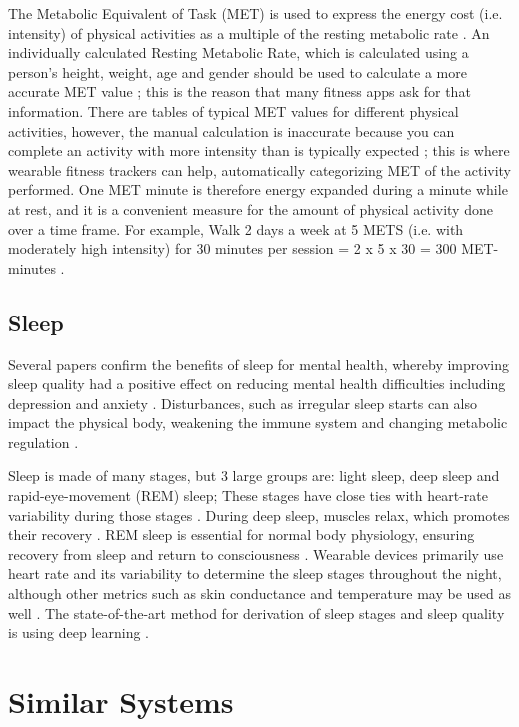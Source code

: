 The Metabolic Equivalent of Task (MET) is used to express the energy cost (i.e. intensity) of physical activities as a multiple of the resting metabolic rate \cite{Jetté1990Metabolic}. An individually calculated Resting Metabolic Rate, which is calculated using a person's height, weight, age and gender should be used to calculate a more accurate MET value \cite{Byrne2005Metabolic}; this is the reason that many fitness apps ask for that information. There are tables of typical MET values for different physical activities, however, the manual calculation is inaccurate because you can complete an activity with more intensity than is typically expected \cite{Jetté1990Metabolic}; this is where wearable fitness trackers can help, automatically categorizing MET of the activity performed. One MET minute is therefore energy expanded during a minute while at rest, and it is a convenient measure for the amount of physical activity done over a time frame. For example, Walk 2 days a week at 5 METS (i.e. with moderately high intensity) for 30 minutes per session = 2 x 5 x 30 = 300 MET-minutes \cite{metMinutes}.
\subsection{Sleep}
Several papers confirm the benefits of sleep for mental health, whereby improving sleep quality had a positive effect on reducing mental health difficulties including depression and anxiety \cite{sleep1, sleep2, sleep3}. Disturbances, such as irregular sleep starts can also impact the physical body, weakening the immune system \cite{sleep4} and changing metabolic regulation \cite{sleep2}.

Sleep is made of many stages, but 3 large groups are: light sleep, deep sleep and rapid-eye-movement (REM) sleep; These stages have close ties with heart-rate variability during those stages \cite{sleepDef}. During deep sleep, muscles relax, which promotes their recovery \cite{Jung2010Energy}. REM sleep is essential for normal body physiology, ensuring recovery from sleep and return to consciousness \cite{VERTES1986371}. Wearable devices primarily use heart rate and its variability to determine the sleep stages throughout the night, although other metrics such as skin conductance and temperature may be used as well \cite{Zambotti2019Wearable}. The state-of-the-art method for derivation of sleep stages and sleep quality is using deep learning \cite{Sathyanarayana2016Sleep}.

\section{Similar Systems}
\label{section:similarSystems}
